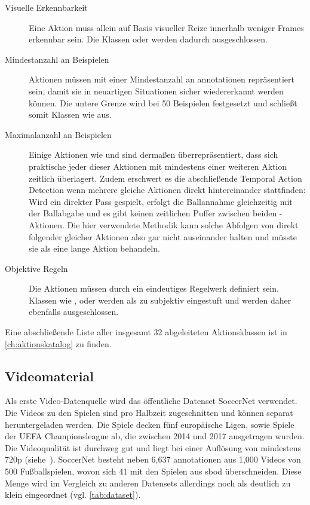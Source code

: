 \begin{description}
    \item[Visuelle Erkennbarkeit] Eine Aktion muss allein auf Basis visueller Reize innerhalb weniger Frames erkennbar sein.
    Die Klassen  oder  werden dadurch ausgeschlossen.
    \item[Mindestanzahl an Beispielen] Aktionen müssen mit einer Mindestanzahl an \gls{annotationen} repräsentiert sein, damit sie in neuartigen Situationen sicher wiedererkannt werden können.
    Die untere Grenze wird bei 50 Beispielen festgesetzt und schließt somit Klassen wie  aus.
    \item[Maximalanzahl an Beispielen] Einige Aktionen wie  und  sind dermaßen überrepräsentiert, dass sich praktische jeder dieser Aktionen mit mindestens einer weiteren Aktion zeitlich überlagert.
    Zudem erschwert es die abschließende Temporal Action Detection wenn mehrere gleiche Aktionen direkt hintereinander stattfinden:
    Wird \zB ein direkter Pass gespielt, erfolgt die Ballannahme gleichzeitig mit der Ballabgabe und es gibt keinen zeitlichen Puffer zwischen beiden -Aktionen.
    Die hier verwendete Methodik kann solche Abfolgen von direkt folgender gleicher Aktionen also gar nicht auseinander halten und müsste sie als eine lange Aktion behandeln.
    \item[Objektive Regeln] Die Aktionen müssen durch ein eindeutiges Regelwerk definiert sein.
    Klassen wie ,  oder  werden als zu subjektiv eingestuft und werden daher ebenfalls ausgeschlossen.
\end{description}

Eine abschließende Liste aller insgesamt 32 abgeleiteten Aktionsklassen ist in \autoref{ch:aktionskatalog} zu finden.

\subsection{Videomaterial}
\label{subsec:videomaterial}

Als erste Video-Datenquelle wird das öffentliche Datenset SoccerNet verwendet.
Die Videos zu den Spielen sind pro Halbzeit zugeschnitten und können separat heruntergeladen werden.
Die Spiele decken fünf europäische Ligen, sowie Spiele der UEFA Championsleague ab, die zwischen 2014 und 2017 ausgetragen wurden.
Die Videoqualität ist durchweg gut und liegt bei einer Auflösung von mindestens 720p (siehe~\cite{SoccerNet20}).
SoccerNet besteht neben 6,637 \gls{annotationen} aus 1,000 Videos von 500 Fußballspielen, wovon sich 41 mit den Spielen aus \gls{sbod} überschneiden.
Diese Menge wird im Vergleich zu anderen Datensets allerdings noch als deutlich zu klein eingeordnet (vgl. \autoref{tab:dataset}).

